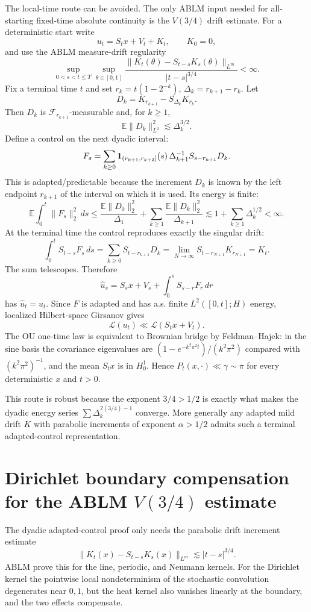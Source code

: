 \documentclass[12pt]{article}
\begin{document}
The local-time route can be avoided.  The only ABLM input needed for
all-starting fixed-time absolute continuity is the $V(3/4)$ drift estimate.
For a deterministic start write
\[
  u_t=S_t x+V_t+K_t,\qquad K_0=0,
\]
and use the ABLM measure-drift regularity
\[
 \sup_{0<s<t\le T}\sup_{\theta\in[0,1]}
 \frac{\|K_t(\theta)-S_{t-s}K_s(\theta)\|_{L^m}}{|t-s|^{3/4}}<\infty .
\]
Fix a terminal time $t$ and set $r_k=t(1-2^{-k})$, $\Delta_k=r_{k+1}-r_k$.
Let
\[
  D_k=K_{r_{k+1}}-S_{\Delta_k}K_{r_k}.
\]
Then $D_k$ is $\mathcal F_{r_{k+1}}$-measurable and, for $k\ge1$,
\[
  \mathbb E\|D_k\|_{L^2}^2\lesssim \Delta_k^{3/2}.
\]
Define a control on the next dyadic interval:
\[
  F_s=\sum_{k\ge0} {\bf1}_{(r_{k+1},r_{k+2}]}(s)\,
       \Delta_{k+1}^{-1}S_{s-r_{k+1}}D_k .
\]
This is adapted/predictable because the increment $D_k$ is known by the
left endpoint $r_{k+1}$ of the interval on which it is used.  Its energy is
finite:
\[
  \mathbb E\int_0^t\|F_s\|_2^2\,ds
  \le \frac{\mathbb E\|D_0\|_2^2}{\Delta_1}
     +\sum_{k\ge1}\frac{\mathbb E\|D_k\|_2^2}{\Delta_{k+1}}
  \lesssim 1+\sum_{k\ge1}\Delta_k^{1/2}<\infty .
\]
At the terminal time the control reproduces exactly the singular drift:
\[
 \int_0^tS_{t-s}F_s\,ds
 =\sum_{k\ge0}S_{t-r_{k+1}}D_k
 =\lim_{N\to\infty}S_{t-r_{N+1}}K_{r_{N+1}}
 =K_t .
\]
The sum telescopes.  Therefore
\[
 \widehat u_s=S_sx+V_s+\int_0^sS_{s-r}F_r\,dr
\]
has $\widehat u_t=u_t$.  Since $F$ is adapted and has a.s. finite
$L^2([0,t];H)$ energy, localized Hilbert-space Girsanov gives
\[
  \mathcal L(u_t)\ll \mathcal L(S_tx+V_t).
\]
The OU one-time law is equivalent to Brownian bridge by Feldman--Hajek:
in the sine basis the covariance eigenvalues are
$(1-e^{-k^2\pi^2 t})/(k^2\pi^2)$ compared with $(k^2\pi^2)^{-1}$, and
the mean $S_tx$ is in $H_0^1$.  Hence $P_t(x,\cdot)\ll\gamma\sim\pi$ for
every deterministic $x$ and $t>0$.

This route is robust because the exponent $3/4>1/2$ is exactly what makes
the dyadic energy series $\sum\Delta_k^{2(3/4)-1}$ converge.  More
generally any adapted mild drift $K$ with parabolic increments of exponent
$\alpha>1/2$ admits such a terminal adapted-control representation.


\section*{Dirichlet boundary compensation for the ABLM \(V(3/4)\) estimate}

The dyadic adapted-control proof only needs the parabolic drift increment
estimate
\[
  \|K_t(x)-S_{t-s}K_s(x)\|_{L^m}\lesssim |t-s|^{3/4}.
\]
ABLM prove this for the line, periodic, and Neumann kernels.  For the
Dirichlet kernel the pointwise local nondeterminism of the stochastic
convolution degenerates near \(0,1\), but the heat kernel also vanishes
linearly at the boundary, and the two effects compensate.
\end{document}
